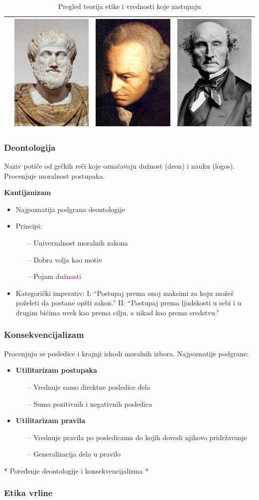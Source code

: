 \documentclass[pdf]{beamer}
\begin{document}
\begin{frame}
\begin{table}
\begin{center}
\begin{tabular}{|l|c|c|c|}
& \includegraphics[scale=.1]{slike/aristotel.jpg} & \includegraphics[scale=.1]{slike/kant.jpg} & \includegraphics[scale=.1]{slike/mil.jpg} \\
\hline
\end{tabular}
\label{tab:tabela1}
\caption{{Pregled teorija etike i vrednosti koje zastupaju}}
\end{center}
\end{table}

\end{frame}

\begin{frame}
\frametitle{Deontologija}

Naziv potiče od grčkih reči koje označavaju dužnost (deon) i nauku (logos). Procenjuje moralnost postupaka.

\textbf{\newline
Kantijanizam}
\begin{itemize}
\item{Najpoznatija podgrana deontologije}
\item{Principi:}
	\begin{itemize}
	\item[--]{Univerzalnost moralnih zakona}
	\item[--]{Dobra volja kao motiv}
	\item[--]{Pojam \textcolor{purple}{dužnosti}} 
	\end{itemize}
\item{Kategorički imperativ:\newline
I: ``Postupaj prema onoj maksimi za koju možeš poželeti da postane opšti zakon.''\newline
II: ``Postupaj prema ljudskosti u sebi i u drugim bićima uvek kao prema cilju, a nikad kao prema sredstvu.''}
\end{itemize} 

\end{frame}

\begin{frame}
\frametitle{Konsekvencijalizam}

Procenjuju se posledice i krajnji ishodi moralnih izbora.\newline
Najpoznatije podgrane:
\begin{itemize}
\item{\textbf{Utilitarizam postupaka}}
	\begin{itemize}
	\item[--]{Vrednuje samo direktne posledice dela}
	\item[--]{Suma pozitivnih i negativnih posledica}
	\end{itemize}
\item{\textbf{Utilitarizam pravila}}
	\begin{itemize}
	\item[--]{Vrednuje pravila po posledicama do kojih dovodi njihovo pridržavanje}
	\item[--]{Generalizacija dela u pravilo}
	\end{itemize}
\end{itemize}

* Poređenje deontologije i konsekvencijalizma *

\end{frame}

\begin{frame}
\frametitle{Etika vrline}

\begin{itemize}
\item{Akcenat na pojmovima ključnim za moralan život -
\end{itemize}
\end{frame}
\end{document}

